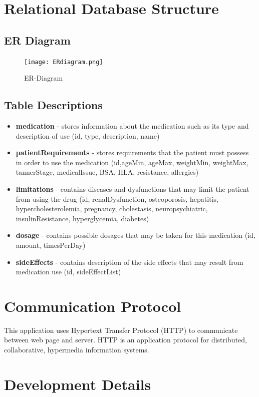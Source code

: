 \documentclass[12pt]{article}
\begin{document}
\section{Relational Database Structure}

\subsection{ER Diagram}
\begin{figure}[H]
  \centering
  \texttt{[image: ERdiagram.png]}
  \caption{ER-Diagram}
  \label{fig:er}
\end{figure}

\subsection{Table Descriptions}
\begin{itemize}
\item \textbf{medication} - stores information about the medication such as its type and description of use (id, type, description, name)
\item \textbf{patientRequirements} - stores requirements that the patient must possess in order to use the medication (id,ageMin, ageMax, weightMin, weightMax, tannerStage, medicalIssue, BSA, HLA, resistance, allergies)

\item \textbf{limitations} - contains diseases and dysfunctions that may limit the patient from using the drug (id, renalDysfunction, osteoporosis, hepatitis, hypercholesterolemia, pregnancy, cholestasis, neuropsychiatric, insulinResistance, hyperglycemia, diabetes)

\item \textbf{dosage} - contains possible dosages that may be taken for this medication (id, amount, timesPerDay)
\item \textbf{sideEffects} - contains description of the side effects that may result from medication use (id, sideEffectList)
\end{itemize}

\section{Communication Protocol}
This application uses Hypertext Transfer Protocol (HTTP) to communicate between web page and server. HTTP is an application protocol for distributed, collaborative, hypermedia information systems.


\section{Development Details}
\end{document}
